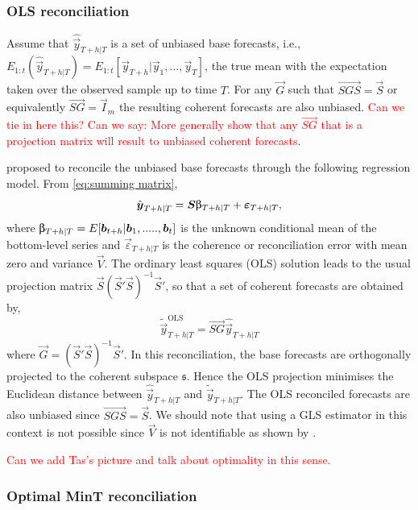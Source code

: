 \documentclass[graybox]{svmult}
\begin{document}
\subsubsection{OLS reconciliation}

Assume that $\hat{\vec{y}}_{T+h|T}$ is a set of unbiased base forecasts, i.e., $E_{1:t}(\hat{\vec{y}}_{T+h|T})= E_{1:t}[\vec{y}_{T+h}|\vec{y}_1,...,\vec{y}_T]$, the true mean with the expectation taken over the observed sample up to time $T$. For any $\vec{G}$ such that $\vec{SGS}=\vec{S}$ or equivalently $\vec{SG}=\vec{I}_m$ the resulting coherent forecasts are also unbiased. \textcolor{red}{Can we tie in here this? Can we say: More generally \citep{Gamakumara2018} show that any $\vec{SG}$ that is a projection matrix will result to unbiased coherent forecasts}.

\cite{HynEtAl2011} proposed to  reconcile the unbiased base forecasts through the following regression model.
From \eqref{eq:summing matrix},
\begin{equation}\label{eq:OLS}
\hat{\vec{y}}_{T+h|T} = \vec{S\ubeta}_{T+h|T} + \vec{\varepsilon}_{T+h|T},
\end{equation}
where $\vec{\ubeta}_{T+h|T}=E[\vec{b}_{t+h}|\vec{b}_1,.....,\vec{b}_t]$ is the unknown conditional mean of the bottom-level series and $\vec{\varepsilon}_{T+h|T}$ is the coherence or reconciliation error with mean zero and variance $\vec{V}$. The ordinary least squares (OLS) solution leads to the usual projection matrix $\vec{S}(\vec{S}'\vec{S})^{-1}\vec{S}'$, so that a set of coherent forecasts are obtained by,
\begin{equation*}
\tilde{\vec{y}}_{T+h|T}^{\text{OLS}} = \vec{SG}\hat{\vec{y}}_{T+h|T}
\end{equation*}
where $\vec{G}=(\vec{S}'\vec{S})^{-1}\vec{S}'$.
In this reconciliation, the base forecasts are orthogonally projected to the coherent subspace $\mathfrak{s}$. Hence the OLS projection minimises the Euclidean distance between $\hat{\vec{y}}_{T+h|T}$ and $\tilde{\vec{y}}_{T+h|T}$. The OLS reconciled forecasts are also unbiased since $\vec{SGS}=\vec{S}$. We should note that using a GLS estimator in this context is not possible since $\vec{V}$ is not identifiable as shown by \cite{WicEtAl2019}.

\textcolor{red}{Can we add Tas's picture and talk about optimality in this sense.}
\subsubsection{Optimal MinT reconciliation}
\end{document}
